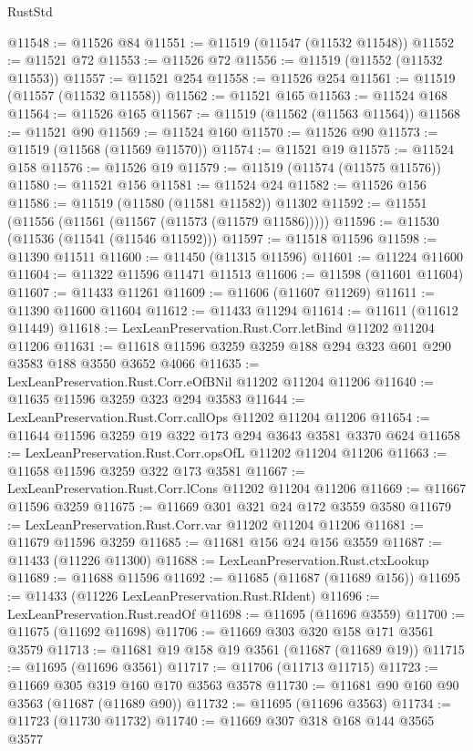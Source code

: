 \begin{lexlean}{RustStd}
\begin{coremodule}
@11548 := @11526 @84
@11551 := @11519 (@11547 (@11532 @11548))
@11552 := @11521 @72
@11553 := @11526 @72
@11556 := @11519 (@11552 (@11532 @11553))
@11557 := @11521 @254
@11558 := @11526 @254
@11561 := @11519 (@11557 (@11532 @11558))
@11562 := @11521 @165
@11563 := @11524 @168
@11564 := @11526 @165
@11567 := @11519 (@11562 (@11563 @11564))
@11568 := @11521 @90
@11569 := @11524 @160
@11570 := @11526 @90
@11573 := @11519 (@11568 (@11569 @11570))
@11574 := @11521 @19
@11575 := @11524 @158
@11576 := @11526 @19
@11579 := @11519 (@11574 (@11575 @11576))
@11580 := @11521 @156
@11581 := @11524 @24
@11582 := @11526 @156
@11586 := @11519 (@11580 (@11581 @11582)) @11302
@11592 := @11551 (@11556 (@11561 (@11567 (@11573 (@11579 @11586)))))
@11596 := @11530 (@11536 (@11541 (@11546 @11592)))
@11597 := @11518 @11596
@11598 := @11390 @11511
@11600 := @11450 (@11315 @11596)
@11601 := @11224 @11600
@11604 := @11322 @11596 @11471 @11513
@11606 := @11598 (@11601 @11604)
@11607 := @11433 @11261
@11609 := @11606 (@11607 @11269)
@11611 := @11390 @11600 @11604
@11612 := @11433 @11294
@11614 := @11611 (@11612 @11449)
@11618 := LexLeanPreservation.Rust.Corr.letBind @11202 @11204 @11206
@11631 := @11618 @11596 @3259 @3259 @188 @294 @323 @601 @290 @3583 @188 @3550 @3652 @4066
@11635 := LexLeanPreservation.Rust.Corr.eOfBNil @11202 @11204 @11206
@11640 := @11635 @11596 @3259 @323 @294 @3583
@11644 := LexLeanPreservation.Rust.Corr.callOps @11202 @11204 @11206
@11654 := @11644 @11596 @3259 @19 @322 @173 @294 @3643 @3581 @3370 @624
@11658 := LexLeanPreservation.Rust.Corr.opsOfL @11202 @11204 @11206
@11663 := @11658 @11596 @3259 @322 @173 @3581
@11667 := LexLeanPreservation.Rust.Corr.lCons @11202 @11204 @11206
@11669 := @11667 @11596 @3259
@11675 := @11669 @301 @321 @24 @172 @3559 @3580
@11679 := LexLeanPreservation.Rust.Corr.var @11202 @11204 @11206
@11681 := @11679 @11596 @3259
@11685 := @11681 @156 @24 @156 @3559
@11687 := @11433 (@11226 @11300)
@11688 := LexLeanPreservation.Rust.ctxLookup
@11689 := @11688 @11596
@11692 := @11685 (@11687 (@11689 @156))
@11695 := @11433 (@11226 LexLeanPreservation.Rust.RIdent)
@11696 := LexLeanPreservation.Rust.readOf
@11698 := @11695 (@11696 @3559)
@11700 := @11675 (@11692 @11698)
@11706 := @11669 @303 @320 @158 @171 @3561 @3579
@11713 := @11681 @19 @158 @19 @3561 (@11687 (@11689 @19))
@11715 := @11695 (@11696 @3561)
@11717 := @11706 (@11713 @11715)
@11723 := @11669 @305 @319 @160 @170 @3563 @3578
@11730 := @11681 @90 @160 @90 @3563 (@11687 (@11689 @90))
@11732 := @11695 (@11696 @3563)
@11734 := @11723 (@11730 @11732)
@11740 := @11669 @307 @318 @168 @144 @3565 @3577

\end{coremodule}
\end{lexlean}
